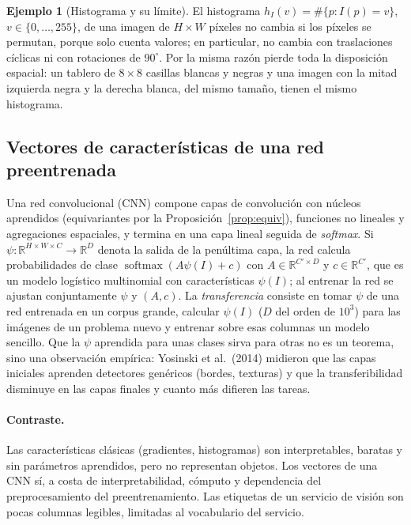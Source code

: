 \documentclass[11pt,a4paper]{article}
\theoremstyle{plain}
\theoremstyle{definition}
\newtheorem{ejemplo}[teorema]{Ejemplo}
\theoremstyle{remark}
\newcommand{\R}{\mathbb{R}}
\newcommand{\1}{\mathbf{1}}
\begin{document}
\begin{ejemplo}[Histograma y su límite]
El histograma $h_I(v)=\#\{p:I(p)=v\}$, $v\in\{0,\dots,255\}$, de una imagen
de $H\times W$ píxeles no cambia si los píxeles se permutan, porque solo
cuenta valores; en particular, no cambia con traslaciones cíclicas ni con
rotaciones de $90^\circ$. Por la misma razón pierde toda la disposición
espacial: un tablero de $8\times8$ casillas blancas y negras y una imagen
con la mitad izquierda negra y la derecha blanca, del mismo tamaño, tienen
el mismo histograma.
\end{ejemplo}

\subsection{Vectores de características de una red preentrenada}

Una red convolucional (CNN) compone capas de convolución con núcleos
aprendidos (equivariantes por la Proposición~\ref{prop:equiv}), funciones
no lineales y agregaciones espaciales, y termina en una capa lineal
seguida de \emph{softmax}. Si $\psi:\R^{H\times W\times C}\to\R^D$ denota
la salida de la penúltima capa, la red calcula probabilidades de clase
$\operatorname{softmax}(A\psi(I)+c)$ con $A\in\R^{C'\times D}$ y
$c\in\R^{C'}$, que es un modelo logístico multinomial con características
$\psi(I)$; al entrenar la red se ajustan conjuntamente $\psi$ y $(A,c)$.
La \emph{transferencia} consiste en tomar $\psi$ de una red entrenada en un
corpus grande, calcular $\psi(I)$ ($D$ del orden de $10^3$) para las
imágenes de un problema nuevo y entrenar sobre esas columnas un modelo
sencillo. Que la $\psi$ aprendida para unas clases sirva para otras no es
un teorema, sino una observación empírica: Yosinski et al.\ (2014) midieron
que las capas iniciales aprenden detectores genéricos (bordes, texturas) y
que la transferibilidad disminuye en las capas finales y cuanto más
difieren las tareas.

\paragraph{Contraste.} Las características clásicas (gradientes,
histogramas) son interpretables, baratas y sin parámetros aprendidos,
pero no representan objetos. Los vectores de una CNN sí, a costa de
interpretabilidad, cómputo y dependencia del preprocesamiento del
preentrenamiento. Las etiquetas de un servicio de visión son pocas
columnas legibles, limitadas al vocabulario del servicio.
\end{document}
